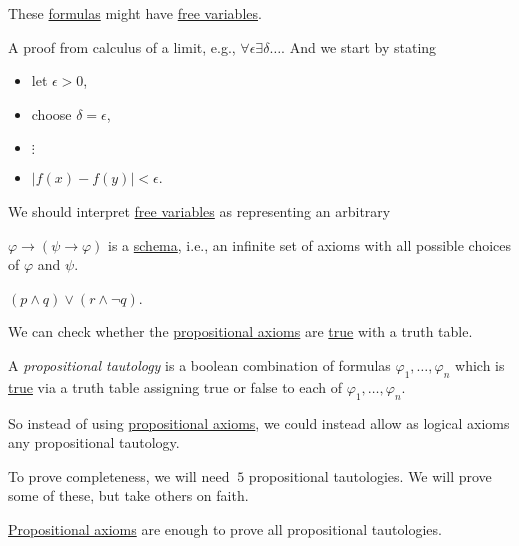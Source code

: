 These \hyperref[def:formula]{formulas} might have \hyperref[def:free-variable]{free variables}.

\begin{eg}
	A proof from calculus of a limit, e.g., \(\forall \epsilon \exists \delta \ldots \). And we start by stating
	\begin{itemize}
		\item let \(\epsilon > 0\),
		\item choose \(\delta =\epsilon \),
		\item \(\vdots\)
		\item \(\vert f(x) - f(y) \vert < \epsilon \).
	\end{itemize}
	We should interpret \hyperref[def:free-variable]{free variables} as representing an arbitrary
\end{eg}

\begin{eg}
	\(\varphi \to (\psi \to  \varphi )\) is a \hyperref[def:schema]{schema}, i.e., an infinite set of axioms with all possible choices of \(\varphi \) and \(\psi \).
\end{eg}

\begin{prev}
	\((p \land q) \lor (r \land \lnot q)\).
\end{prev}

\begin{remark}
	We can check whether the \hyperref[def:propositional-axioms]{propositional axioms} are \hyperref[def:truth]{true} with a truth table.
\end{remark}

\begin{definition}\label{def:propositional-tautology}
	A \emph{propositional tautology} is a boolean combination of formulas \(\varphi _1, \ldots , \varphi _n\) which is \hyperref[def:truth]{true} via a truth table assigning true or false to each of \(\varphi _1, \ldots , \varphi _n\).
\end{definition}

So instead of using \hyperref[def:propositional-axioms]{propositional axioms}, we could instead allow as logical axioms any propositional tautology.

To prove completeness, we will need \(~5\) propositional tautologies. We will prove some of these, but take others on faith.

\begin{remark}
	\hyperref[def:propositional-axioms]{Propositional axioms} are enough to prove all propositional tautologies.
\end{remark}

